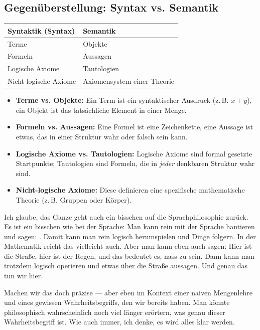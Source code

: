 \subsection{Gegenüberstellung: Syntax vs. Semantik}
\begin{math-stroke}
\begin{center}
\begin{tabular}{l | l}
    \toprule
    \textbf{Syntaktik (Syntax)} & \textbf{Semantik} \\ 
    \midrule
    Terme & Objekte \\
    Formeln & Aussagen \\
    Logische Axiome & Tautologien \\
    Nicht-logische Axiome & Axiomensystem einer Theorie \\
    \bottomrule
\end{tabular}
\end{center}

\begin{explanation-of-steps}
\begin{itemize}
    \item \textbf{Terme vs. Objekte:} Ein Term ist ein syntaktischer Ausdruck (z.\,B. $x+y$), ein Objekt ist das tatsächliche Element in einer Menge.
    \item \textbf{Formeln vs. Aussagen:} Eine Formel ist eine Zeichenkette, eine Aussage ist etwas, das in einer Struktur wahr oder falsch sein kann.
    \item \textbf{Logische Axiome vs. Tautologien:} Logische Axiome sind formal gesetzte Startpunkte; Tautologien sind Formeln, die in \emph{jeder} denkbaren Struktur wahr sind.
    \item \textbf{Nicht-logische Axiome:} Diese definieren eine spezifische mathematische Theorie (z.\,B. Gruppen oder Körper).
\end{itemize}
\end{explanation-of-steps}
\end{math-stroke}

\begin{spoken-clean}[00:37:30 - 00:39:40]
Ich glaube, das Ganze geht auch ein bisschen auf die Sprachphilosophie zurück. Es ist ein bisschen wie bei der Sprache: Man kann rein mit der Sprache hantieren und sagen: . Damit kann man rein logisch herumspielen und Dinge folgern. In der Mathematik reicht das vielleicht auch. Aber man kann eben auch sagen: Hier ist die Straße, hier ist der Regen, und das bedeutet es, nass zu sein. Dann kann man trotzdem logisch operieren und etwas über die Straße aussagen. Und genau das tun wir hier.

Machen wir das doch präzise --- aber eben im Kontext einer naiven Mengenlehre und eines gewissen Wahrheitsbegriffs, den wir bereits haben. Man könnte philosophisch wahrscheinlich noch viel länger erörtern, was genau dieser Wahrheitsbegriff ist. Wie auch immer, ich denke, es wird alles klar werden.
\end{spoken-clean}

